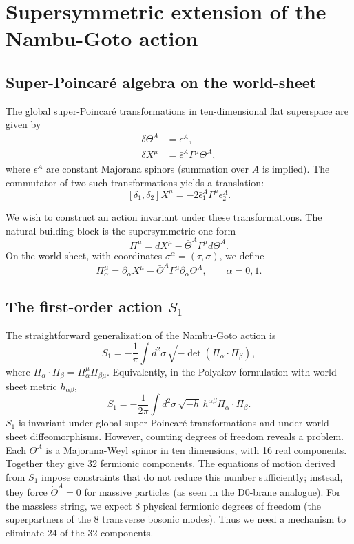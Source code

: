 \documentclass[12pt]{article}
\begin{document}
\section{Supersymmetric extension of the Nambu-Goto action}

\subsection{Super-Poincar\'e algebra on the world-sheet}

The global super-Poincar\'e transformations in ten-dimensional flat superspace are given by
\begin{align}
\delta \Theta^{A} &= \epsilon^{A}, \label{sup:theta}\\
\delta X^{\mu} &= \bar{\epsilon}^{A}\Gamma^{\mu}\Theta^{A}, \label{sup:x}
\end{align}
where $\epsilon^{A}$ are constant Majorana spinors (summation over $A$ is implied). The commutator of two such transformations yields a translation:
\[
[\delta_1,\delta_2]X^\mu = -2\bar{\epsilon}_1^A\Gamma^\mu\epsilon_2^A.
\]

We wish to construct an action invariant under these transformations. The natural building block is the supersymmetric one-form
\[
\Pi^\mu = dX^\mu - \bar{\Theta}^A\Gamma^\mu d\Theta^A.
\]
On the world-sheet, with coordinates $\sigma^\alpha = (\tau,\sigma)$, we define
\[
\Pi^\mu_\alpha = \partial_\alpha X^\mu - \bar{\Theta}^A\Gamma^\mu\partial_\alpha\Theta^A, \qquad \alpha=0,1.
\]

\subsection{The first-order action $S_1$}

The straightforward generalization of the Nambu-Goto action is
\[
S_1 = -\frac{1}{\pi}\int d^2\sigma\,\sqrt{-\det(\Pi_\alpha\cdot\Pi_\beta)},
\]
where $\Pi_\alpha\cdot\Pi_\beta = \Pi_\alpha^\mu \Pi_{\beta\mu}$. Equivalently, in the Polyakov formulation with world-sheet metric $h_{\alpha\beta}$,
\[
S_1 = -\frac{1}{2\pi}\int d^2\sigma\,\sqrt{-h}\,h^{\alpha\beta}\Pi_\alpha\cdot\Pi_\beta.
\]
$S_1$ is invariant under global super-Poincar\'e transformations and under world-sheet diffeomorphisms. However, counting degrees of freedom reveals a problem. Each $\Theta^A$ is a Majorana-Weyl spinor in ten dimensions, with 16 real components. Together they give 32 fermionic components. The equations of motion derived from $S_1$ impose constraints that do not reduce this number sufficiently; instead, they force $\dot{\Theta}^A=0$ for massive particles (as seen in the D0-brane analogue). For the massless string, we expect 8 physical fermionic degrees of freedom (the superpartners of the 8 transverse bosonic modes). Thus we need a mechanism to eliminate 24 of the 32 components.
\end{document}
